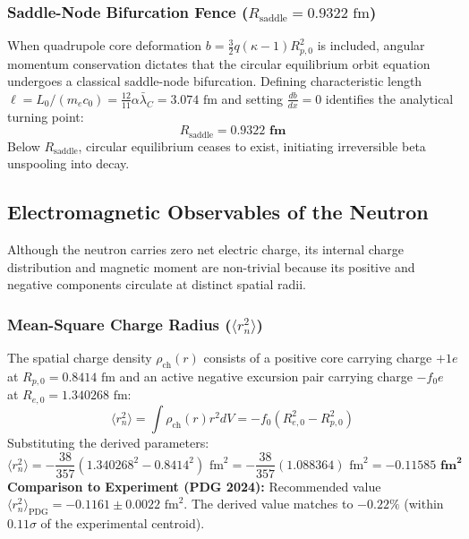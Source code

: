 \documentclass[11pt,a4paper]{article}
\begin{document}
\subsubsection{Saddle-Node Bifurcation Fence ($R_{\text{saddle}} = 0.9322\text{ fm}$)}
\label{subsubsec:saddle_node}

When quadrupole core deformation $b = \frac{3}{2}q(\kappa - 1)R_{p,0}^2$ is included, angular momentum conservation dictates that the circular equilibrium orbit equation undergoes a classical saddle-node bifurcation. Defining characteristic length $\ell = L_0 / (m_e c_0) = \frac{12}{11}\alpha \bar{\lambda}_C = 3.074\text{ fm}$ and setting $\frac{db}{dx} = 0$ identifies the analytical turning point:
\begin{equation}
R_{\text{saddle}} = \mathbf{0.9322\text{ fm}}
\end{equation}
Below $R_{\text{saddle}}$, circular equilibrium ceases to exist, initiating irreversible beta unspooling into decay.

\subsection{Electromagnetic Observables of the Neutron}
\label{subsec:neutron_em_observables}

Although the neutron carries zero net electric charge, its internal charge distribution and magnetic moment are non-trivial because its positive and negative components circulate at distinct spatial radii.

\subsubsection{Mean-Square Charge Radius ($\langle r_n^2 \rangle$)}
\label{subsubsec:charge_radius}

The spatial charge density $\rho_{\text{ch}}(r)$ consists of a positive core carrying charge $+1e$ at $R_{p,0} = 0.8414\text{ fm}$ and an active negative excursion pair carrying charge $-f_0 e$ at $R_{e,0} = 1.340268\text{ fm}$:
\begin{equation}
\langle r_n^2 \rangle = \int \rho_{\text{ch}}(r) r^2 dV = -f_0 \left( R_{e,0}^2 - R_{p,0}^2 \right)
\end{equation}
Substituting the derived parameters:
\begin{equation}
\boxed{\langle r_n^2 \rangle = -\frac{38}{357} \left( 1.340268^2 - 0.8414^2 \right)\text{ fm}^2 = -\frac{38}{357}(1.088364)\text{ fm}^2 = \mathbf{-0.11585\text{ fm}^2}}
\end{equation}
\textbf{Comparison to Experiment (PDG 2024):} Recommended value $\langle r_n^2 \rangle_{\text{PDG}} = -0.1161 \pm 0.0022\text{ fm}^2$. The derived value matches to \textbf{$-0.22\%$} (within $0.11\sigma$ of the experimental centroid).
\end{document}
